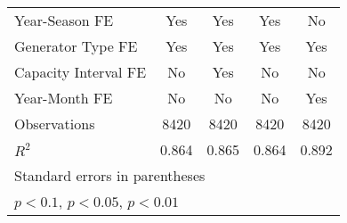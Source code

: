 \documentclass[leqno]{article}
\begin{document}
\begin{table}[h]
\begin{tabular}{l*{4}{c}}
\midrule
Year-Season FE         &    Yes &    Yes&    Yes&    No\\  
Generator Type FE        &    Yes &    Yes&    Yes&    Yes\\  
Capacity Interval FE    &   No &    Yes&    No&    No\\  
Year-Month FE        &    No &    No&    No&    Yes\\  
Observations                   &    8420         &   8420        &    8420         &    8420        \\
$R^2$                  &        0.864         &      0.865          &        0.864          &        0.892         \\
\hline \hline
\multicolumn{5}{l}{\footnotesize Standard errors in parentheses}\\
\multicolumn{5}{l}{\footnotesize \sym{*} \(p<0.1\), \sym{**} \(p<0.05\), \sym{***} \(p<0.01\)}\\
\end{tabular}
\end{table}
\end{document}
